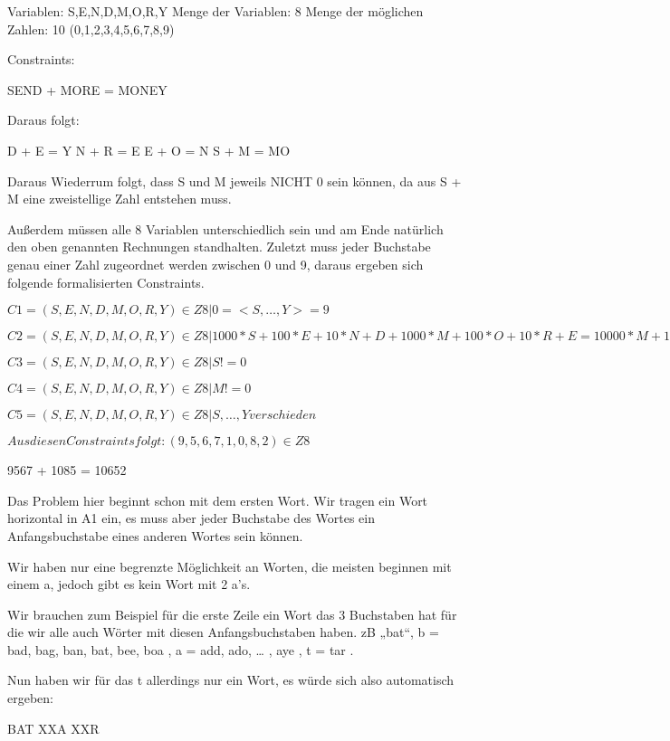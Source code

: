 \documentclass[ngerman]{fbi-aufgabenblatt}
\begin{document}
Variablen: S,E,N,D,M,O,R,Y
Menge der Variablen: 8
Menge der möglichen Zahlen: 10 (0,1,2,3,4,5,6,7,8,9)

Constraints:

SEND + MORE = MONEY

Daraus folgt:

D + E = Y
N + R = E
E + O = N
S + M = MO

Daraus Wiederrum folgt, dass S und M jeweils NICHT 0 sein können, da aus S + M eine zweistellige Zahl entstehen muss.

Außerdem müssen alle 8 Variablen unterschiedlich sein und am Ende natürlich den oben genannten Rechnungen standhalten. Zuletzt muss jeder Buchstabe genau einer Zahl zugeordnet werden zwischen 0 und 9, daraus ergeben sich folgende formalisierten Constraints.

$C1 ={ (S,E,N,D,M,O,R,Y) \in Z8 | 0 =< S,…,Y >= 9 }$

$C2 = { (S,E,N,D,M,O,R,Y) \in Z8 | 1000 * S + 100 * E + 10 * N + D
					        +1000 * M + 100 * O + 10 * R + E
			   = 10000 * M + 1000 * O + 100 * N + 10 * E + Y }$
			   
$C3 = { (S,E,N,D,M,O,R,Y) \in Z8 | S != 0 }$

$C4 = { (S,E,N,D,M,O,R,Y) \in Z8 | M != 0 }$

$C5 = { (S,E,N,D,M,O,R,Y) \in Z8 | S,…,Y verschieden }$

$Aus diesen Constraints folgt: (9,5,6,7,1,0,8,2) \in Z8$

	9567
+	1085
= 10652



Das Problem hier beginnt schon mit dem ersten Wort. Wir tragen ein Wort horizontal in A1 ein, es muss aber jeder Buchstabe des Wortes ein Anfangsbuchstabe eines anderen Wortes sein können.

Wir haben nur eine begrenzte Möglichkeit an Worten, die meisten beginnen mit einem a, jedoch gibt es kein Wort mit 2 a’s.

Wir brauchen zum Beispiel für die erste Zeile ein Wort das 3 Buchstaben hat für die wir alle auch Wörter mit diesen Anfangsbuchstaben haben. zB „bat“, b  = { bad, bag, ban, bat, bee, boa }, a = { add, ado, … , aye }, t = { tar }.

Nun haben wir für das t allerdings nur ein Wort, es würde sich also automatisch ergeben:

BAT \newline
XXA \newline
XXR \newline
\end{document}
